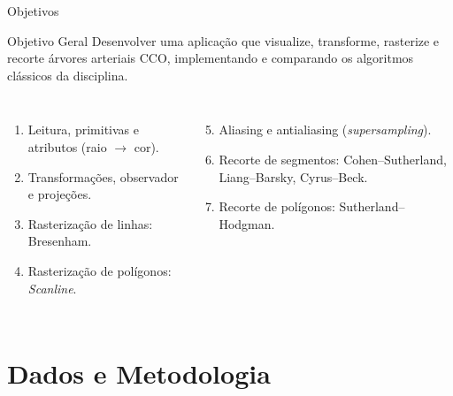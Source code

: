 \documentclass[aspectratio=169,11pt]{beamer}
\begin{document}
\begin{frame}{Objetivos}
\begin{block}{Objetivo Geral}
Desenvolver uma aplicação que visualize, transforme, rasterize e recorte árvores arteriais CCO, implementando e comparando os algoritmos clássicos da disciplina.
\end{block}

\vspace{0.2cm}

\small
\begin{columns}[T]
\begin{enumerate}
  \item Leitura, primitivas e atributos (raio $\to$ cor).
  \item Transformações, observador e projeções.
  \item Rasterização de linhas: Bresenham.
  \item Rasterização de polígonos: \emph{Scanline}.
\end{enumerate}
\begin{enumerate}\setcounter{enumi}{4}
  \item Aliasing e antialiasing (\emph{supersampling}).
  \item Recorte de segmentos: Cohen--Sutherland, Liang--Barsky, Cyrus--Beck.
  \item Recorte de polígonos: Sutherland--Hodgman.
\end{enumerate}
\end{columns}
\end{frame}

\section{Dados e Metodologia}
\end{document}
